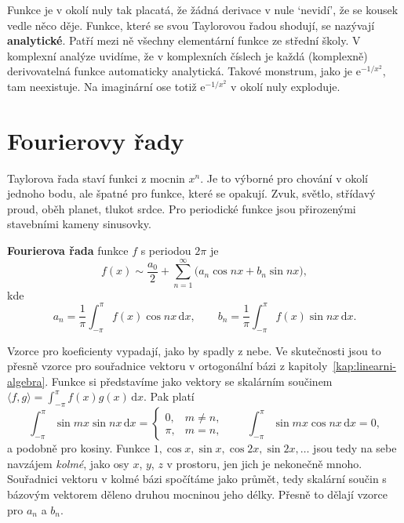 Funkce je v okolí nuly tak placatá, že žádná derivace v nule `nevidí', že se kousek vedle něco děje. Funkce, které se svou Taylorovou řadou shodují, se nazývají \textbf{analytické}. Patří mezi ně všechny elementární funkce ze střední školy. V komplexní analýze uvidíme, že v komplexních číslech je každá (komplexně) derivovatelná funkce automaticky analytická. Takové monstrum, jako je $\mathrm{e}^{-1/x^2}$, tam neexistuje. Na imaginární ose totiž $\mathrm{e}^{-1/x^2}$ v okolí nuly exploduje.

\section{Fourierovy řady}

Taylorova řada staví funkci z mocnin $x^n$. Je to výborné pro chování v okolí jednoho bodu, ale špatné pro funkce, které se opakují. Zvuk, světlo, střídavý proud, oběh planet, tlukot srdce. Pro periodické funkce jsou přirozenými stavebními kameny sinusovky.

\begin{definitionbox}
  \textbf{Fourierova řada} funkce $f$ s periodou $2\pi$ je
  \begin{equation*}
    f(x)\sim\frac{a_0}{2} + \sum_{n=1}^{\infty}\big(a_n\cos nx + b_n\sin nx\big),
  \end{equation*}
  kde
  \begin{equation*}
    a_n = \frac{1}{\pi}\int_{-\pi}^{\pi}f(x)\cos nx\,\mathrm{d}x,\qquad b_n = \frac{1}{\pi}\int_{-\pi}^{\pi}f(x)\sin nx\,\mathrm{d}x.
  \end{equation*}
\end{definitionbox}

Vzorce pro koeficienty vypadají, jako by spadly z nebe. Ve skutečnosti jsou to přesně vzorce pro souřadnice vektoru v ortogonální bázi z kapitoly~\ref{kap:linearni-algebra}. Funkce si představíme jako vektory se skalárním součinem $\langle f, g\rangle = \int_{-\pi}^{\pi}f(x)g(x)\,\mathrm{d}x$. Pak platí
\begin{equation*}
  \int_{-\pi}^{\pi}\sin mx\sin nx\,\mathrm{d}x = \begin{cases}0, & m\neq n,\\ \pi, & m = n,\end{cases}\qquad\int_{-\pi}^{\pi}\sin mx\cos nx\,\mathrm{d}x = 0,
\end{equation*}
a podobně pro kosiny. Funkce $1, \cos x, \sin x, \cos 2x, \sin 2x, \dots$ jsou tedy na sebe navzájem \textit{kolmé}, jako osy $x$, $y$, $z$ v prostoru, jen jich je nekonečně mnoho. Souřadnici vektoru v kolmé bázi spočítáme jako průmět, tedy skalární součin s bázovým vektorem děleno druhou mocninou jeho délky. Přesně to dělají vzorce pro $a_n$ a $b_n$.

